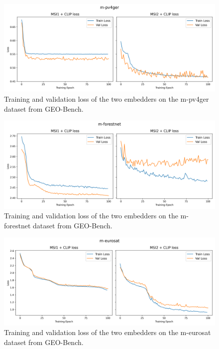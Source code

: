 \documentclass[a4paper, oneside, english]{sapthesis} %
\begin{document}
\begin{figure}[h]
    \centering
    \includegraphics[width=\textwidth]{img/m-pv4ger_loss_plot.png}
    \caption{Training and validation loss of the two embedders on the m-pv4ger dataset from GEO-Bench.}
    \label{fig:solarloss}
\end{figure}

\vspace{-0.3cm}

\begin{figure}[h]
    \centering
    \includegraphics[width=\textwidth]{img/m-forestnet_loss_plot.png}
    \caption{Training and validation loss of the two embedders on the m-forestnet dataset from GEO-Bench.}
    \label{fig:foresloss}
\end{figure}

\begin{figure}[h]
    \centering
    \includegraphics[width=\textwidth]{img/m-eurosat_loss_plot.png}
    \caption{Training and validation loss of the two embedders on the m-eurosat dataset from GEO-Bench.}
    \label{fig:meurosatloss}
\end{figure}
\end{document}
